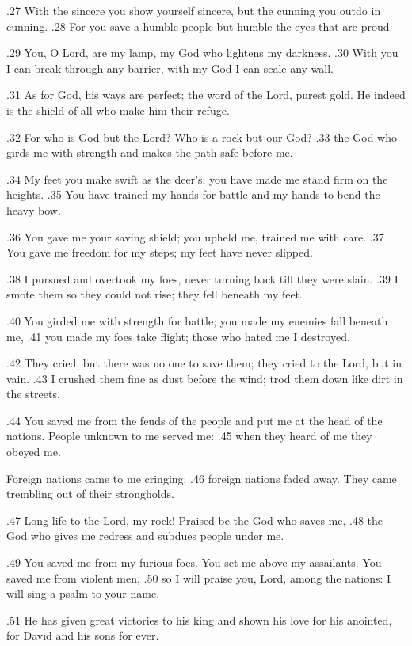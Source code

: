 .27 With the sincere you show yourself sincere,
but the cunning you outdo in cunning.
.28 For you save a humble people
but humble the eyes that are proud.

.29 You, O Lord, are my lamp,
my God who lightens my darkness.
.30 With you I can break through any barrier,
with my God I can scale any wall.

.31 As for God, his ways are perfect;
the word of the Lord, purest gold.
He indeed is the shield
of all who make him their refuge.

.32 For who is God but the Lord?
Who is a rock but our God?
.33 the God who girds me with strength
and makes the path safe before me.

.34 My feet you make swift as the deer's;
you have made me stand firm on the heights.
.35 You have trained my hands for battle
and my hands to bend the heavy bow.

.36 You gave me your saving shield;
you upheld me, trained me with care.
.37 You gave me freedom for my steps;
my feet have never slipped.

.38 I pursued and overtook my foes,
never turning back till they were slain.
.39 I smote them so they could not rise;
they fell beneath my feet.

.40 You girded me with strength for battle;
you made my enemies fall beneath me,
.41 you made my foes take flight;
those who hated me I destroyed.

.42 They cried, but there was no one to save them;
they cried to the Lord, but in vain.
.43 I crushed them fine as dust before the wind;
trod them down like dirt in the streets.

.44 You saved me from the feuds of the people
and put me at the head of the nations.
People unknown to me served me:
.45 when they heard of me they obeyed me.

Foreign nations came to me cringing:
.46 foreign nations faded away.
They came trembling out of their strongholds.

.47 Long life to the Lord, my rock!
Praised be the God who saves me,
.48 the God who gives me redress
and subdues people under me.

.49 You saved me from my furious foes.
You set me above my assailants.
You saved me from violent men,
.50 so I will praise you, Lord, among the nations:
I will sing a psalm to your name.

.51 He has given great victories to his king
and shown his love for his anointed,
for David and his sons for ever.


